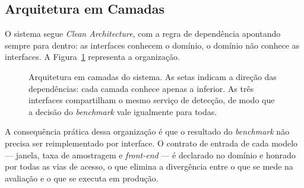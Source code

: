 \documentclass[12pt,a4paper]{article}
\begin{document}
\subsection{Arquitetura em Camadas}

O sistema segue \textit{Clean Architecture}, com a regra de dependência
apontando sempre para dentro: as interfaces conhecem o domínio, o domínio não
conhece as interfaces. A Figura~\ref{fig:arquitetura_sistema} representa a
organização.

\begin{figure}[H]
	\centering
	\caption[Arquitetura em camadas do sistema]{Arquitetura em camadas do sistema.
		As setas indicam a direção das dependências: cada camada conhece apenas a
		inferior. As três interfaces compartilham o mesmo serviço de detecção, de modo
		que a decisão do \textit{benchmark} vale igualmente para todas.}
	\label{fig:arquitetura_sistema}
\end{figure}

A consequência prática dessa organização é que o resultado do \textit{benchmark}
não precisa ser reimplementado por interface. O contrato de entrada de cada
modelo --- janela, taxa de amostragem e \textit{front-end} --- é declarado no
domínio e honrado por todas as vias de acesso, o que elimina a divergência
entre o que se mede na avaliação e o que se executa em produção.
\end{document}
